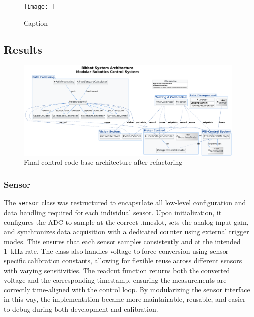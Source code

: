 \begin{figure}
    \centering
    \texttt{[image: ]}
    \caption{Caption}
    \label{fig:enter-label}
\end{figure}


\subsection{Results}

\begin{figure} [H]
	\centering
	\includegraphics[width=\linewidth]{images/Software documentation/architecture3.png}
	\caption{Final control code base architecture after refactoring}
	\label{fig:architecture}
\end{figure}






\subsubsection{Sensor}
The \texttt{sensor} class was restructured to encapsulate all low-level configuration and data handling required for each individual sensor. Upon initialization, it configures the ADC to sample at the correct timeslot, sets the analog input gain, and synchronizes data acquisition with a dedicated counter using external trigger modes. This ensures that each sensor samples consistently and at the intended \SI{1}{\kilo\hertz} rate. The class also handles voltage-to-force conversion using sensor-specific calibration constants, allowing for flexible reuse across different sensors with varying sensitivities. The readout function returns both the converted voltage and the corresponding timestamp, ensuring the measurements are correctly time-aligned with the control loop. By modularizing the sensor interface in this way, the implementation became more maintainable, reusable, and easier to debug during both development and calibration.

